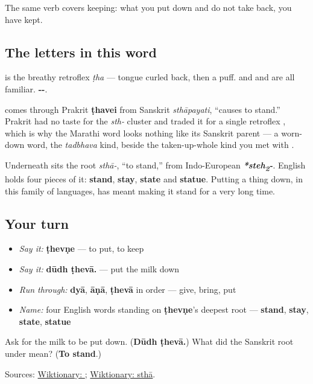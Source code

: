The same verb covers keeping: what you put down and do not take back, you have kept.

\subsection*{The letters in this word}
\textbf{} is the breathy retroflex \emph{ṭha} — tongue curled back, then a puff. \textbf{} and \textbf{} and \textbf{} are all familiar. \textbf{--}.

\begin{cousinweb}
\textbf{} comes through Prakrit \textbf{ṭhavei} from Sanskrit \emph{sthāpayati}, \textquotedblleft{}causes to stand.\textquotedblright{} Prakrit had no taste for the \emph{sth-} cluster and traded it for a single retroflex \textbf{}, which is why the Marathi word looks nothing like its Sanskrit parent — a worn-down word, the \emph{tadbhava} kind, beside the taken-up-whole kind you met with \textbf{}.

Underneath sits the root \emph{sthā-}, \textquotedblleft{}to stand,\textquotedblright{} from Indo-European \emph{\textbf{*steh\textsubscript{2}-}}. English holds four pieces of it: \textbf{stand}, \textbf{stay}, \textbf{state} and \textbf{statue}. Putting a thing down, in this family of languages, has meant making it stand for a very long time.
\end{cousinweb}

\subsection*{Your turn}
\begin{itemize}
\raggedright
  \item \emph{Say it:} \textbf{ṭhevṇe} — to put, to keep
  \item \emph{Say it:} \textbf{dūdh ṭhevā.} — put the milk down
  \item \emph{Run through:} \textbf{dyā}, \textbf{āṇā}, \textbf{ṭhevā} in order — give, bring, put
  \item \emph{Name:} four English words standing on \textbf{ṭhevṇe}'s deepest root — \textbf{stand}, \textbf{stay}, \textbf{state}, \textbf{statue}
\end{itemize}

\begin{tcolorbox}[breakable,colback=teal!4,colframe=teal!35!black,title={Before you move on}]
Ask for the milk to be put down. (\textbf{Dūdh ṭhevā.}) What did the Sanskrit root under \textbf{} mean? (\textbf{To stand}.)

Sources: \href{https://en.wiktionary.org/wiki/\%E0\%A4\%A0\%E0\%A5\%87\%E0\%A4\%B5\%E0\%A4\%A3\%E0\%A5\%87}{Wiktionary: }; \href{https://en.wiktionary.org/wiki/\%E0\%A4\%B8\%E0\%A5\%8D\%E0\%A4\%A5\%E0\%A4\%BE}{Wiktionary: sthā}.
\end{tcolorbox}
